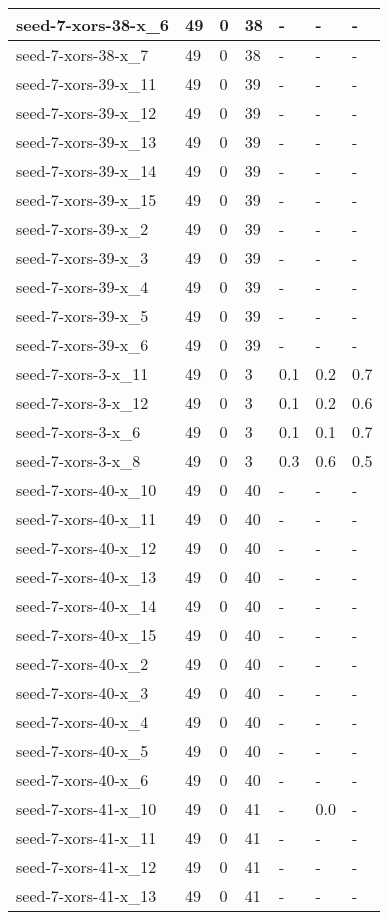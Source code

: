 \begin{scriptsize}
\begin{longtable}{|p{5cm}|l|l|l|l|l|l|}
seed-7-xors-38-x\_6&49&0&38&-&-&- \\ \hline 
seed-7-xors-38-x\_7&49&0&38&-&-&- \\ \hline 
seed-7-xors-39-x\_11&49&0&39&-&-&- \\ \hline 
seed-7-xors-39-x\_12&49&0&39&-&-&- \\ \hline 
seed-7-xors-39-x\_13&49&0&39&-&-&- \\ \hline 
seed-7-xors-39-x\_14&49&0&39&-&-&- \\ \hline 
seed-7-xors-39-x\_15&49&0&39&-&-&- \\ \hline 
seed-7-xors-39-x\_2&49&0&39&-&-&- \\ \hline 
seed-7-xors-39-x\_3&49&0&39&-&-&- \\ \hline 
seed-7-xors-39-x\_4&49&0&39&-&-&- \\ \hline 
seed-7-xors-39-x\_5&49&0&39&-&-&- \\ \hline 
seed-7-xors-39-x\_6&49&0&39&-&-&- \\ \hline 
seed-7-xors-3-x\_11&49&0&3&0.1&0.2&0.7 \\ \hline 
seed-7-xors-3-x\_12&49&0&3&0.1&0.2&0.6 \\ \hline 
seed-7-xors-3-x\_6&49&0&3&0.1&0.1&0.7 \\ \hline 
seed-7-xors-3-x\_8&49&0&3&0.3&0.6&0.5 \\ \hline 
seed-7-xors-40-x\_10&49&0&40&-&-&- \\ \hline 
seed-7-xors-40-x\_11&49&0&40&-&-&- \\ \hline 
seed-7-xors-40-x\_12&49&0&40&-&-&- \\ \hline 
seed-7-xors-40-x\_13&49&0&40&-&-&- \\ \hline 
seed-7-xors-40-x\_14&49&0&40&-&-&- \\ \hline 
seed-7-xors-40-x\_15&49&0&40&-&-&- \\ \hline 
seed-7-xors-40-x\_2&49&0&40&-&-&- \\ \hline 
seed-7-xors-40-x\_3&49&0&40&-&-&- \\ \hline 
seed-7-xors-40-x\_4&49&0&40&-&-&- \\ \hline 
seed-7-xors-40-x\_5&49&0&40&-&-&- \\ \hline 
seed-7-xors-40-x\_6&49&0&40&-&-&- \\ \hline 
seed-7-xors-41-x\_10&49&0&41&-&0.0&- \\ \hline 
seed-7-xors-41-x\_11&49&0&41&-&-&- \\ \hline 
seed-7-xors-41-x\_12&49&0&41&-&-&- \\ \hline 
seed-7-xors-41-x\_13&49&0&41&-&-&- \\ \hline 

\end{longtable}
\end{scriptsize}
